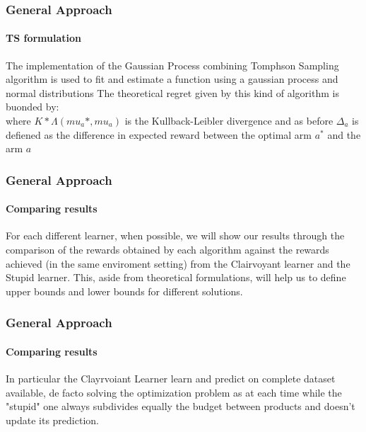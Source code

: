 \documentclass[11pt]{beamer}
\begin{document}

\begin{frame}[fragile]

\frametitle{General Approach}
\framesubtitle{TS formulation}

The implementation of the Gaussian Process combining Tomphson Sampling algorithm is used to fit and estimate a function using a gaussian process and normal distributions
The theoretical regret given by this kind of algorithm is buonded by:
\begin{displaymath}
\end{displaymath}
where $K*\Lambda(mu_a*,mu_a)$ is the Kullback-Leibler divergence and as before $\Delta_a$ is defiened as the difference in expected reward between the optimal arm $a^*$ and the arm $a$
\end{frame}


\begin{frame}

\frametitle{General Approach}
\framesubtitle{Comparing results}

For each different learner, when possible, we will show our results through the comparison of the rewards obtained by each algorithm against the rewards achieved (in the same enviroment setting) from the Clairvoyant learner and the Stupid learner.
This, aside from theoretical formulations, will help us to define upper bounds and lower bounds for different solutions.


\end{frame}


\begin{frame}

\frametitle{General Approach}
\framesubtitle{Comparing results}

In particular the Clayrvoiant Learner learn and predict on complete dataset available, de facto solving the optimization problem as at each time while the "stupid" one always subdivides equally the budget between products and
doesn't update its prediction.

\end{frame}
\end{document}
